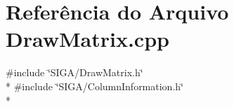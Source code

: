 \section{Referência do Arquivo Draw\+Matrix.\+cpp}
\label{_draw_matrix_8cpp}
{\ttfamily \#include \char`\"{}S\+I\+G\+A/\+Draw\+Matrix.\+h\char`\"{}}\\*
{\ttfamily \#include \char`\"{}S\+I\+G\+A/\+Column\+Information.\+h\char`\"{}}\\*
